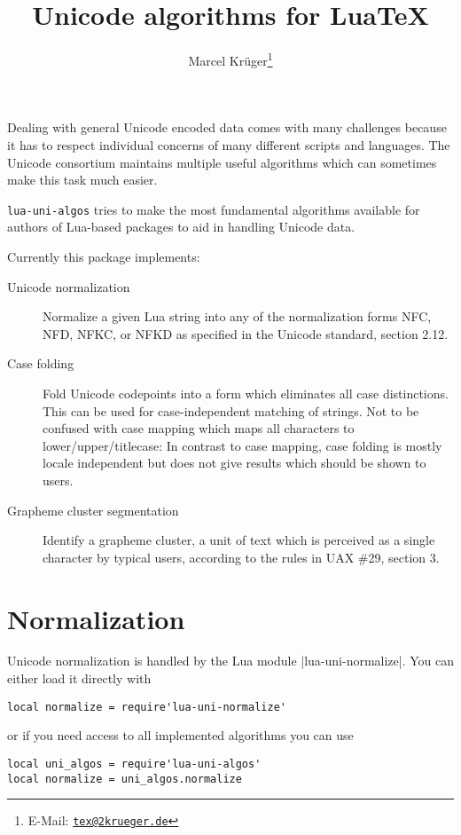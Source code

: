 \documentclass{article}
\title{Unicode algorithms for Lua\TeX}
\author{Marcel Krüger\thanks{E-Mail: \href{mailto:tex@2krueger.de}{\nolinkurl{tex@2krueger.de}}}}
\newcommand\pkg{\texttt}
\begin{document}
\maketitle
Dealing with general Unicode encoded data comes with many challenges because it has to respect individual concerns of many different scripts and languages. The Unicode consortium maintains multiple useful algorithms which can sometimes make this task much easier.

\pkg{lua-uni-algos} tries to make the most fundamental algorithms available for authors of Lua-based packages to aid in handling Unicode data.

Currently this package implements:
\begin{description}
  \item[Unicode normalization] Normalize a given Lua string into any of the normalization forms NFC, NFD, NFKC, or NFKD as specified in the Unicode standard, section 2.12.
  \item[Case folding] Fold Unicode codepoints into a form which eliminates all case distinctions. This can be used for case-independent matching of strings. Not to be confused with case mapping which maps all characters to lower/upper/titlecase: In contrast to case mapping, case folding is mostly locale independent but does not give results which should be shown to users.
  \item[Grapheme cluster segmentation] Identify a grapheme cluster, a unit of text which is perceived as a single character by typical users, according to the rules in UAX \#29, section 3.
\end{description}
\section{Normalization}
Unicode normalization is handled by the Lua module |lua-uni-normalize|.
You can either load it directly with
\begin{verbatim}
local normalize = require'lua-uni-normalize'
\end{verbatim}
or if you need access to all implemented algorithms you can use
\begin{verbatim}
local uni_algos = require'lua-uni-algos'
local normalize = uni_algos.normalize
\end{verbatim}
\end{document}

